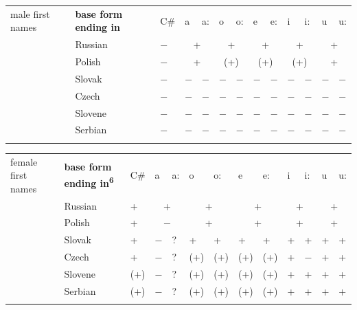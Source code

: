 \documentclass[output=paper]{langscibook}
\begin{document}
\begin{tabularx}{\textwidth}{XXXXXXXXXXXXX}

\lsptoprule

male first names & {\bfseries base form ending in\footnotemark{}} & C\# & a & a: & o & o: & e & e: & i & i: & u & u:\\
& Russian & $-$ & \multicolumn{2}{c}{ +} & \multicolumn{2}{c}{ +} & \multicolumn{2}{c}{ +} & \multicolumn{2}{c}{ +} & \multicolumn{2}{c}{ +}\\
& Polish & $-$ & \multicolumn{2}{c}{ +} & \multicolumn{2}{c}{ (+)} & \multicolumn{2}{c}{ (+)} & \multicolumn{2}{c}{ (+)} & \multicolumn{2}{c}{ +}\\
& Slovak & $-$ & $-$ & $-$ & $-$ & $-$ & $-$ & $-$ & $-$ & $-$ & $-$ & $-$\\
& Czech & $-$ & $-$ & $-$ & $-$ & $-$ & $-$ & $-$ & $-$ & $-$ & $-$ & $-$\\
& Slovene & $-$ & $-$ & $-$ & $-$ & $-$ & $-$ & $-$ & $-$ & $-$ & $-$ & $-$\\
& Serbian & $-$ & $-$ & $-$ & $-$ & $-$ & $-$ & $-$ & $-$ & $-$ & $-$ & $-$\\
\lspbottomrule
\end{tabularx}
\begin{table}
\caption{Uninflectability of male first names}
\label{tab:key:7}
\end{table}


\begin{tabularx}{\textwidth}{XXXXXXXXXXXXX}

\lsptoprule

female first names & {\bfseries base form ending in\textsuperscript{6}} & C\# & a & a: & o & o: & e & e: & i & i: & u & u:\\
& Russian & + & \multicolumn{2}{c}{ +} & \multicolumn{2}{c}{ +} & \multicolumn{2}{c}{ +} & \multicolumn{2}{c}{ +} & \multicolumn{2}{c}{ +}\\
& Polish & + & \multicolumn{2}{c}{ $-$} & \multicolumn{2}{c}{ +} & \multicolumn{2}{c}{ +} & \multicolumn{2}{c}{ +} & \multicolumn{2}{c}{ +}\\
& Slovak & + & $-$ & ? & + & + & + & + & + & + & + & +\\
& Czech & + & $-$ & ? & (+) & (+) & (+) & (+) & + & $-$ & + & +\\
& Slovene & (+) & $-$ & ? & (+) & (+) & (+) & (+) & + & + & + & +\\
& Serbian & (+) & $-$ & ? & (+) & (+) & (+) & (+) & + & + & + & +\\
\lspbottomrule
\end{tabularx}
\begin{table}
\caption{Uninflectability of female first names}
\label{tab:key:8}
\end{table}
\end{document}
